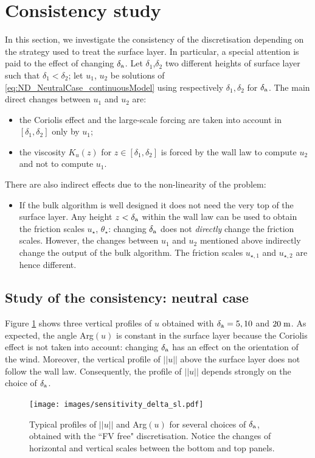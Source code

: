 \section{Consistency study}
\label{sec:ND_Consistency}
In this section, we investigate the consistency of the
discretisation depending on the strategy used to treat the
surface layer. In particular, a special attention is paid to
the effect of changing $\delta_{\rm a}$.
Let $\delta_1$,$\delta_2$ two
different heights of surface layer
such that $\delta_1 < \delta_2$;
let $u_1$, $u_2$ be solutions of 
\eqref{eq:ND_NeutralCase_continuousModel} using
respectively $\delta_1, \delta_2$ for $\delta_{\rm a}$.
The main direct changes between $u_1$ and $u_2$ are:
\begin{itemize}
\item the Coriolis effect and the large-scale forcing are
taken into account in $[\delta_{1}, \delta_{2}]$
		only by $u_1$;
\item the viscosity $K_u(z)$ for $z \in [\delta_{1}, \delta_{2}]$
	is forced by the wall law to compute $u_2$
		and not to compute $u_1$.
\end{itemize}
There are also indirect effects due to the non-linearity of the
problem:
\begin{itemize}
	\item If the bulk algorithm is well designed it does not
		need the very top of the surface layer. Any height
		$z<\delta_{\rm a}$ within the wall law can be used
		to obtain the friction scales $u_\star$,
		$\theta_\star$: changing $\delta_{\rm a}$ does
		not \textit{directly} change the friction scales.
		However, the changes between $u_1$ and $u_2$ mentioned
		above indirectly change the output of the
		bulk algorithm.
		The friction scales $u_{\star, 1}$ and $u_{\star, 2}$
		are hence different.
\end{itemize}
\subsection{Study of the consistency: neutral case}
Figure \ref{fig:ND_Consistency_sensitivity_delta_sl} shows
three vertical profiles of $u$ obtained with
$\delta_{\rm a} = 5, 10$ and $20 \; {\rm m}$.
As expected, the angle Arg$(u)$
is constant in the surface layer because
the Coriolis effect is not taken into
account: changing $\delta_{\rm a}$
has an effect on the orientation of the wind.
Moreover, the vertical profile of $||u||$ above the
surface layer does not follow the wall law.
Consequently, the profile of $||u||$ depends strongly
on the choice of $\delta_{\rm a}$.
%
\begin{figure}
	\centering
\texttt{[image: images/sensitivity\_delta\_sl.pdf]}
	\caption{Typical profiles of $||u||$ and Arg$(u)$ for several
	choices of $\delta_{\rm a}$, obtained with the ``FV free"
	discretisation. Notice the changes of horizontal
	and vertical scales between the bottom and top panels.}
	\label{fig:ND_Consistency_sensitivity_delta_sl}
\end{figure}
